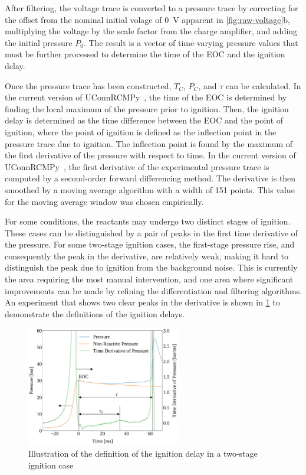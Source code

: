 \documentclass[12pt]{ussci}
\begin{document}
After filtering, the voltage trace is converted to a pressure trace by
correcting for the offset from the nominal initial volage of \SI{0}{\V} apparent
in \mbox{\cref{fig:raw-voltage}b}, multiplying the voltage by the scale factor
from the charge amplifier, and adding the initial pressure \(P_0\). The result
is a vector of time-varying pressure values that must be further processed to
determine the time of the EOC and the ignition delay.

Once the pressure trace has been constructed, \(T_C\), \(P_C\), and \(\tau\) can
be calculated. In the current version of UConnRCMPy~\autocite{uconnrcmpy}, the
time of the EOC is determined by finding the local maximum of the pressure prior
to ignition. Then, the ignition delay is determined as the time difference
between the EOC and the point of ignition, where the point of ignition is
defined as the inflection point in the pressure trace due to ignition. The
inflection point is found by the maximum of the first derivative of the pressure
with respect to time. In the current version of
UConnRCMPy~\autocite{uconnrcmpy}, the first derivative of the experimental
pressure trace is computed by a second-order forward differencing method. The
derivative is then smoothed by a moving average algorithm with a width of 151
points. This value for the moving average window was chosen empirically.

For some conditions, the reactants may undergo two distinct stages of ignition.
These cases can be distinguished by a pair of peaks in the first time derivative
of the pressure. For some two-stage ignition cases, the first-stage pressure
rise, and consequently the peak in the derivative, are relatively weak, making
it hard to distinguish the peak due to ignition from the background noise. This
is currently the area requiring the most manual intervention, and one area where
significant improvements can be made by refining the differentiation and
filtering algorithms. An experiment that shows two clear peaks in the derivative
is shown in \cref{fig:ign-delay-def} to demonstrate the definitions of the
ignition delays.

\begin{figure}[htbp]
    \centering
    \includegraphics[width=0.6\textwidth]{figures/ign-delay-def.pdf}
    \caption{Illustration of the definition of the ignition delay in a
    two-stage ignition case}
    \label{fig:ign-delay-def}
\end{figure}
\end{document}
